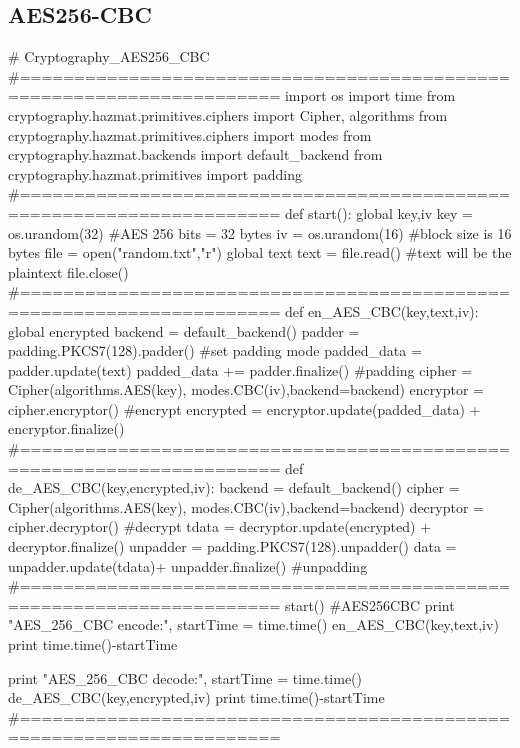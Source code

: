 \documentclass{article}
\begin{document}
\subsection{AES256-CBC}
\begin{python}
# Cryptography_AES256_CBC
#======================================================================
import os
import time
from cryptography.hazmat.primitives.ciphers import Cipher, algorithms
from cryptography.hazmat.primitives.ciphers import modes
from cryptography.hazmat.backends import default_backend
from cryptography.hazmat.primitives import padding
#======================================================================
def start():
    global key,iv
    key = os.urandom(32)                    #AES 256 bits = 32 bytes
    iv = os.urandom(16)                     #block size is 16 bytes
    file = open("random.txt","r")
    global text 
    text = file.read()                      #text will be the plaintext
    file.close()
#======================================================================
def en_AES_CBC(key,text,iv):
    global encrypted
    backend = default_backend()
    padder = padding.PKCS7(128).padder()              #set padding mode
    padded_data = padder.update(text)
    padded_data += padder.finalize()                           #padding
    cipher = Cipher(algorithms.AES(key), modes.CBC(iv),backend=backend)
    encryptor = cipher.encryptor()
    #encrypt
    encrypted = encryptor.update(padded_data) + encryptor.finalize()
#======================================================================
def de_AES_CBC(key,encrypted,iv):
    backend = default_backend()
    cipher = Cipher(algorithms.AES(key), modes.CBC(iv),backend=backend)
    decryptor = cipher.decryptor()
    #decrypt
    tdata = decryptor.update(encrypted) + decryptor.finalize()
    unpadder = padding.PKCS7(128).unpadder()
    data = unpadder.update(tdata)+ unpadder.finalize()       #unpadding
#======================================================================
start()
#AES256CBC
print "AES_256_CBC encode:",
startTime = time.time()
en_AES_CBC(key,text,iv)
print time.time()-startTime

print "AES_256_CBC decode:",
startTime = time.time()
de_AES_CBC(key,encrypted,iv)
print time.time()-startTime
#======================================================================
\end{python}
\newpage
\end{document}
